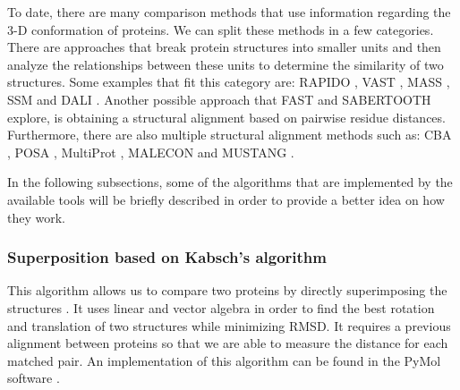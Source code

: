 
To date, there are many comparison methods that use information regarding the 3-D conformation of proteins. We can split these methods in a few categories. There are approaches that break protein structures into smaller units and then analyze the relationships between these units to determine the similarity of two structures. Some examples that fit this category are: RAPIDO \cite{mosca2008alignment}, VAST \cite{gibrat1996surprising}, MASS \cite{dror2003mass}, SSM \cite{krissinel2003protein} and DALI \cite{holm1993protein}. Another possible approach that FAST \cite{zhu2005fast} and SABERTOOTH \cite{teichert2007sabertooth} explore, is obtaining a structural alignment based on pairwise residue distances. Furthermore, there are also multiple structural alignment methods such as: CBA \cite{ebert2006development}, POSA \cite{ye2005multiple}, MultiProt \cite{shatsky2004method}, MALECON \cite{ochagavia2004progressive} and MUSTANG \cite{konagurthu2006mustang}.

In the following subsections, some of the algorithms that are implemented by the available tools will be briefly described in order to provide a better idea on how they work.

\subsubsection{Superposition based on Kabsch's algorithm}

This algorithm allows us to compare two proteins by directly superimposing the structures \cite{kabsch1976solution}. It uses linear and vector algebra in order to find the best rotation and translation of two structures while minimizing RMSD. It requires a previous alignment between proteins so that we are able to measure the distance for each matched pair. An implementation of this algorithm can be found in the PyMol software \cite{delano2002pymol}.

